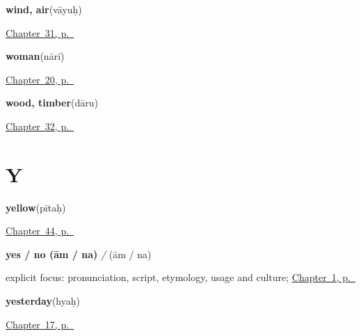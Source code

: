 \noindent\begin{minipage}[t]{\linewidth}
\raggedright
\textbf{wind, air}\enspace\emph{}\enspace(vāyuḥ)\par
\footnotesize \hyperref[ch:sa-sky]{Chapter~31, p.~\pageref*{ch:sa-sky}}
\end{minipage}\par\smallskip

\noindent\begin{minipage}[t]{\linewidth}
\raggedright
\textbf{woman}\enspace\emph{}\enspace(nārī)\par
\footnotesize \hyperref[ch:sa-people]{Chapter~20, p.~\pageref*{ch:sa-people}}
\end{minipage}\par\smallskip

\noindent\begin{minipage}[t]{\linewidth}
\raggedright
\textbf{wood, timber}\enspace\emph{}\enspace(dāru)\par
\footnotesize \hyperref[ch:sa-tree]{Chapter~32, p.~\pageref*{ch:sa-tree}}
\end{minipage}\par\smallskip

\section*{Y}

\noindent\begin{minipage}[t]{\linewidth}
\raggedright
\textbf{yellow}\enspace\emph{}\enspace(pītaḥ)\par
\footnotesize \hyperref[ch:sa-colours]{Chapter~44, p.~\pageref*{ch:sa-colours}}
\end{minipage}\par\smallskip

\noindent\begin{minipage}[t]{\linewidth}
\raggedright
\textbf{yes / no (ām / na)}\enspace\emph{ / }\enspace(ām / na)\par
\footnotesize explicit focus: pronunciation, script, etymology, usage and culture; \hyperref[ch:greetings]{Chapter~1, p.~\pageref*{ch:greetings}}
\end{minipage}\par\smallskip

\noindent\begin{minipage}[t]{\linewidth}
\raggedright
\textbf{yesterday}\enspace\emph{}\enspace(hyaḥ)\par
\footnotesize \hyperref[ch:sa-time]{Chapter~17, p.~\pageref*{ch:sa-time}}
\end{minipage}\par\smallskip

